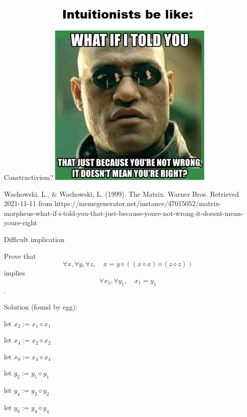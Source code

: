 \documentclass{beamer}
\newcommand{\op}{\diamond}
\begin{document}
\begin{frame}{Constructivism?}
\includegraphics[width=0.6\textwidth]{intuitionists}

\tiny Wachowski, L., \& Wachowski, L. (1999). The Matrix. Warner Bros. Retrieved 2021-11-11 from https://memegenerator.net/instance/47015052/matrix-morpheus-what-if-i-told-you-that-just-because-youre-not-wrong-it-doesnt-mean-youre-right
\end{frame}


\begin{frame}{Difficult implication}

Prove that
$$ \forall x, \forall y,\forall z,\quad x = y \op ((x \op x) \op (z \op z)) $$
implies
$$ \forall x_1, \forall y_1,\quad x_1 = y_1 $$
.

\pause
Solution (found by egg):\smallskip

let $x_2 := x_1 \op x_1$

let $x_4 := x_2 \op x_2$

let $x_8 := x_4 \op x_4$

let $y_2 := y_1 \op y_1$

let $y_4 := y_2 \op y_2$

let $y_8 := y_4 \op y_4$

\end{frame}
\end{document}
